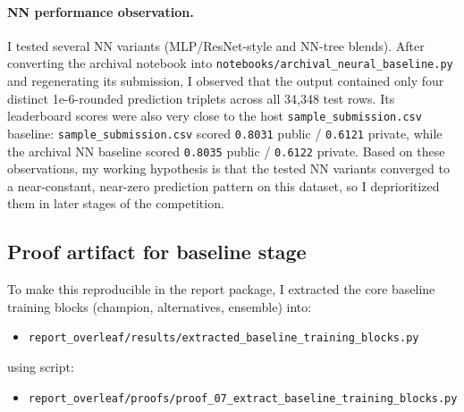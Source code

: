\paragraph{NN performance observation.}
I tested several NN variants (MLP/ResNet-style and NN-tree blends). After converting the archival notebook into \texttt{notebooks/archival\_neural\_baseline.py} and regenerating its submission, I observed that the output contained only four distinct 1e-6-rounded prediction triplets across all 34{,}348 test rows. Its leaderboard scores were also very close to the host \texttt{sample\_submission.csv} baseline: \texttt{sample\_submission.csv} scored \texttt{0.8031} public / \texttt{0.6121} private, while the archival NN baseline scored \texttt{0.8035} public / \texttt{0.6122} private. Based on these observations, my working hypothesis is that the tested NN variants converged to a near-constant, near-zero prediction pattern on this dataset, so I deprioritized them in later stages of the competition.

\subsection{Proof artifact for baseline stage}
To make this reproducible in the report package, I extracted the core baseline training blocks (champion, alternatives, ensemble) into:
\begin{itemize}[leftmargin=1.5em]
  \item \texttt{report\_overleaf/results/extracted\_baseline\_training\_blocks.py}
\end{itemize}
using script:
\begin{itemize}[leftmargin=1.5em]
  \item \texttt{report\_overleaf/proofs/proof\_07\_extract\_baseline\_training\_blocks.py}
\end{itemize}
